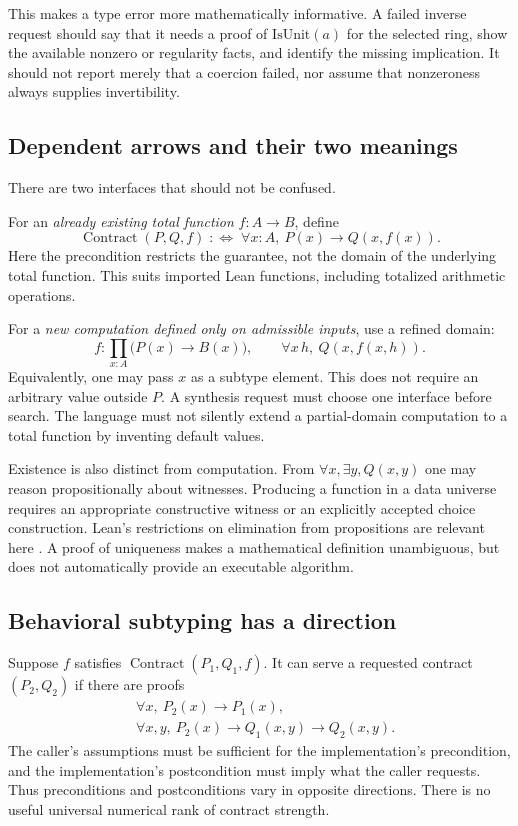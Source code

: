 \documentclass[11pt,a4paper]{article}
\newcommand{\Contract}{\operatorname{Contract}}
\theoremstyle{plain}
\theoremstyle{definition}
\begin{document}
This makes a type error more mathematically informative. A failed inverse request should say that it needs a proof of $\mathrm{IsUnit}(a)$ for the selected ring, show the available nonzero or regularity facts, and identify the missing implication. It should not report merely that a coercion failed, nor assume that nonzeroness always supplies invertibility.

\subsection{Dependent arrows and their two meanings}
There are two interfaces that should not be confused.

For an \emph{already existing total function} $f:A\to B$, define
\[
 \Contract(P,Q,f)\;:\!\iff\;\forall x:A,\ P(x)\to Q(x,f(x)).
\]
Here the precondition restricts the guarantee, not the domain of the underlying total function. This suits imported Lean functions, including totalized arithmetic operations.

For a \emph{new computation defined only on admissible inputs}, use a refined domain:
\[
 f:\prod_{x:A}\bigl(P(x)\to B(x)\bigr),\qquad
 \forall x\,h,\ Q(x,f(x,h)).
\]
Equivalently, one may pass $x$ as a subtype element. This does not require an arbitrary value outside $P$. A synthesis request must choose one interface before search. The language must not silently extend a partial-domain computation to a total function by inventing default values.

Existence is also distinct from computation. From $\forall x,\exists y,Q(x,y)$ one may reason propositionally about witnesses. Producing a function in a data universe requires an appropriate constructive witness or an explicitly accepted choice construction. Lean's restrictions on elimination from propositions are relevant here \cite{lean-inductive}. A proof of uniqueness makes a mathematical definition unambiguous, but does not automatically provide an executable algorithm.

\subsection{Behavioral subtyping has a direction}
Suppose $f$ satisfies $\Contract(P_1,Q_1,f)$. It can serve a requested contract $(P_2,Q_2)$ if there are proofs
\begin{align}
 &\forall x,\ P_2(x)\to P_1(x),\label{eq:prevariance}\\
 &\forall x,y,\ P_2(x)\to Q_1(x,y)\to Q_2(x,y).\label{eq:postvariance}
\end{align}
The caller's assumptions must be sufficient for the implementation's precondition, and the implementation's postcondition must imply what the caller requests. Thus preconditions and postconditions vary in opposite directions. There is no useful universal numerical rank of contract strength.
\end{document}
